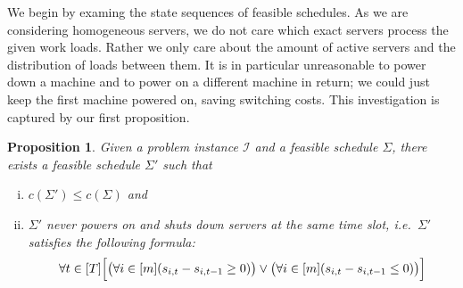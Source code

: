 \documentclass[hidelinks]{article}
\theoremstyle{plain}
\newtheorem{prop}[thm]{Proposition}
\theoremstyle{definition}
\theoremstyle{rem}
\newcommand{\inp}{\mathcal{I}}
\newcommand{\costs}{c}
\begin{document}
We begin by examing the state sequences of feasible schedules. As we are considering homogeneous servers, we do not care which exact servers process the given work loads. Rather we only care about the amount of active servers and the distribution of loads between them. It is in particular unreasonable to power down a machine and to power on a different machine in return; we could just keep the first machine powered on, saving switching costs.
This investigation is captured by our first proposition.
\begin{prop}\label{prop_strict_switching}
Given a problem instance $\inp$ and a feasible schedule $\Sigma$, there exists a feasible schedule $\Sigma'$ such that 
\begin{enumerate}[(i)]
		\item $\costs(\Sigma')\le \costs(\Sigma)$ and 
		\item $\Sigma'$ never powers on and shuts down servers at the same time slot, i.e.\ $\Sigma'$ satisfies the following formula:
\begin{equation}
	\forall t\in[T]\Bigl[\bigl(\forall i\in[m](s_{i,t}-s_{i,t-1}\ge0)\bigr)\lor\bigl(\forall i\in[m](s_{i,t}-s_{i,t-1}\le 0)\bigr)\Bigr]\label{eq_strict_switching}
\end{equation}
\end{enumerate}
\end{prop}
\end{document}
